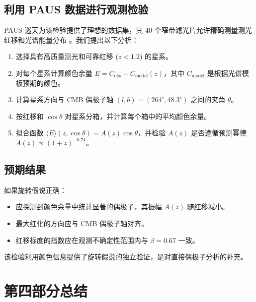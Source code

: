 \documentclass[11pt,a4paper]{article}
\begin{document}
	\subsection{利用 PAUS 数据进行观测检验}
	
	PAUS 巡天为该检验提供了理想的数据集，其 40 个窄带滤光片允许精确测量测光红移和光谱能量分布 \cite{Alarcon2019}。我们提出以下分析：
	
	\begin{enumerate}
		\item 选择具有高质量测光和可靠红移 (\(z < 1.2\)) 的星系。
		\item 对每个星系计算颜色余量 \(E = C_{\mathrm{obs}} - C_{\mathrm{model}}(z)\)，其中 \(C_{\mathrm{model}}\) 是根据光谱模板预期的颜色。
		\item 计算星系方向与 CMB 偶极子轴 \((l,b) = (264^\circ, 48.3^\circ)\) 之间的夹角 \(\theta\)。
		\item 按红移和 \(\cos\theta\) 对星系分箱，并计算每个箱中的平均颜色余量。
		\item 拟合函数 \(\langle E \rangle(z,\cos\theta) = A(z) \cos\theta\)，并检验 \(A(z)\) 是否遵循预测幂律 \(A(z) \propto (1+z)^{-0.74}\)。
	\end{enumerate}
	
	\subsection{预期结果}
	
	如果旋转假说正确：
	\begin{itemize}
		\item 应探测到颜色余量中统计显著的偶极子，其振幅 \(A(z)\) 随红移减小。
		\item 最大红化的方向应与 CMB 偶极子轴对齐。
		\item 红移标度的指数应在观测不确定性范围内与 \(\beta = 0.67\) 一致。
	\end{itemize}
	
	该检验利用颜色信息提供了旋转假说的独立验证，是对直接偶极子分析的补充。
	
	\section{第四部分总结}
	
\end{document}
